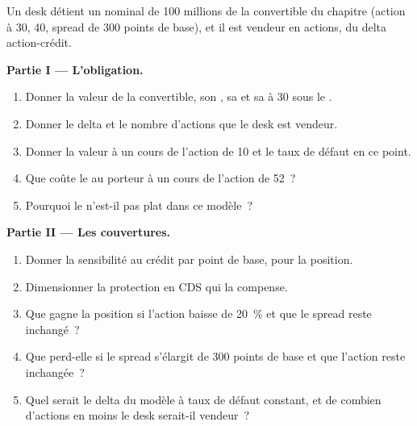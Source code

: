 \begin{problem}\label{pb:dv:convertibles-and-the-credit-equity-link:1}
Un desk détient un nominal de 100 millions de la convertible du chapitre (action à 30,  40, spread de 300 points de base), et il est vendeur
en actions, du delta action-crédit.

\medskip\noindent\textbf{Partie I --- L'obligation.}
\begin{enumerate}
\item Donner la valeur de la convertible, son , sa  et sa  à 30 sous le .
\item Donner le delta et le nombre d'actions que le desk est vendeur.
\item Donner la valeur à un cours de l'action de 10 et le taux de défaut en ce point.
\item Que coûte le  au porteur à un cours de l'action de 52~?
\item Pourquoi le  n'est-il pas plat dans ce modèle~?
\end{enumerate}

\medskip\noindent\textbf{Partie II --- Les couvertures.}
\begin{enumerate}[resume]
\item Donner la sensibilité au crédit par point de base, pour la position.
\item Dimensionner la protection en CDS qui la compense.
\item Que gagne la position si l'action baisse de 20~\% et que le spread reste inchangé~?
\item Que perd-elle si le spread s'élargit de 300 points de base et que l'action reste inchangée~?
\item Quel serait le delta du modèle à taux de défaut constant, et de combien d'actions en moins le desk serait-il vendeur~?
\end{enumerate}


\end{problem}
